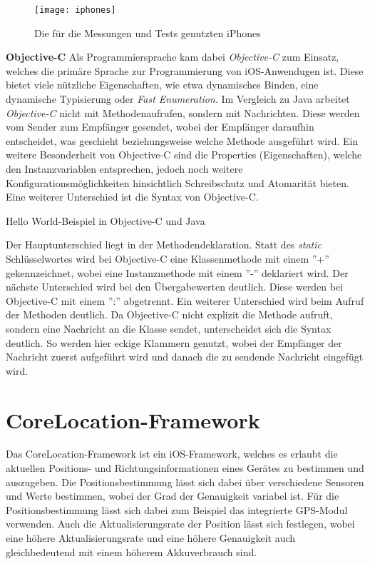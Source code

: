 \begin{figure}[htb!]
		\centering
	\texttt{[image: iphones]}
	\caption{Die für die Messungen und Tests genutzten iPhones}
	\label{iphones}
\end{figure}

\textbf{Objective-C}
Als Programmiersprache kam dabei \emph{Objective-C} zum Einsatz, welches die primäre Sprache zur Programmierung von iOS-Anwendugen ist. 
Diese bietet viele nützliche Eigenschaften, wie etwa dynamisches Binden, eine dynamische Typisierung oder \emph{Fast Enumeration}.
Im Vergleich zu Java arbeitet \emph{Objective-C} nicht mit Methodenaufrufen, sondern mit Nachrichten. Diese werden vom Sender zum Empfänger gesendet, wobei der Empfänger daraufhin entscheidet, was geschieht beziehungsweise welche Methode ausgeführt wird. Ein weitere Besonderheit von Objective-C sind die Properties (Eigenschaften), welche den Instanzvariablen entsprechen, jedoch noch weitere Konfigurationsmöglichkeiten hinsichtlich Schreibschutz und Atomarität bieten.
Eine weiterer Unterschied ist die Syntax von Objective-C.

\begin{listing}[htb!]
    \caption{Hello World-Beispiel in Objective-C und Java}
	\label{lst:helloworld_objc}
\end{listing}

Der Hauptunterschied liegt in der Methodendeklaration. Statt des \emph{static} Schlüsselwortes wird bei Objective-C eine Klassenmethode mit einem ''+'' gekennzeichnet, wobei eine Instanzmethode mit einem ''-'' deklariert wird. Der nächste Unterschied wird bei den Übergabewerten deutlich. Diese werden bei Objective-C mit einem '':'' abgetrennt.
Ein weiterer Unterschied wird beim Aufruf der Methoden deutlich. Da Objective-C nicht explizit die Methode aufruft, sondern eine Nachricht an die Klasse sendet, unterscheidet sich die Syntax deutlich. So werden hier eckige Klammern genutzt, wobei der Empfänger der Nachricht zuerst aufgeführt wird und danach die zu sendende Nachricht eingefügt wird.


\section{CoreLocation-Framework}
\label{sec:technologies:corelocation}
Das CoreLocation-Framework ist ein iOS-Framework, welches es erlaubt die aktuellen Positions- und Richtungsinformationen eines Gerätes zu bestimmen und auszugeben.
Die Positionsbestimmung lässt sich dabei über verschiedene Sensoren und Werte bestimmen, wobei der Grad der Genauigkeit variabel ist.
Für die Positionsbestimmung lässt sich dabei zum Beispiel das integrierte GPS-Modul verwenden.
Auch die Aktualisierungsrate der Position lässt sich festlegen, wobei eine höhere Aktualisierungsrate und eine höhere Genauigkeit auch gleichbedeutend mit einem höherem Akkuverbrauch sind.

